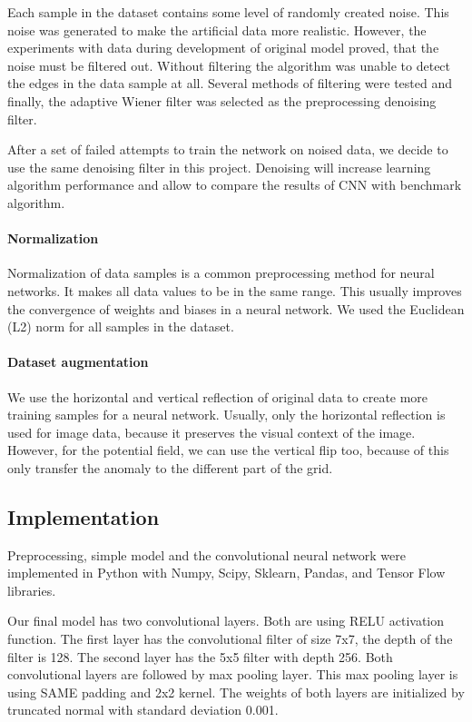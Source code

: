 \documentclass{article}
\begin{document}
Each sample in the dataset contains some level of randomly created
noise. This noise was generated to make the artificial data more
realistic. However, the experiments with data during development of
original model \cite{lenka}
proved, that the noise must be filtered out. Without filtering the
algorithm was unable to detect the edges in the data sample at all.
Several methods of filtering were tested and finally, the adaptive
Wiener filter was selected as the preprocessing denoising filter.

After a set of failed attempts to train the network on noised data, we
decide to use the same denoising filter in this project. Denoising will
increase learning algorithm performance and allow to compare the results
of CNN with benchmark algorithm.

\paragraph{Normalization}\label{normalization}

Normalization of data samples is a common preprocessing method for
neural networks. It makes all data values to be in the same range. This
usually improves the convergence of weights and biases in a neural
network. We used the Euclidean (L2) norm for all samples in the dataset.

\paragraph{Dataset augmentation}\label{dataset-augmentation}

We use the horizontal and vertical reflection of original data to create
more training samples for a neural network. Usually, only the horizontal
reflection is used for image data, because it preserves the visual
context of the image. However, for the potential field, we can use the
vertical flip too, because of this only transfer the anomaly to the
different part of the grid.

\subsection{Implementation}\label{implementation}

Preprocessing, simple model and the convolutional neural network were
implemented in Python with Numpy, Scipy, Sklearn, Pandas, and Tensor
Flow libraries.

Our final model has two convolutional layers. Both are using RELU
activation function. The first layer has the convolutional filter of
size 7x7, the depth of the filter is 128. The second layer has the 5x5
filter with depth 256. Both convolutional layers are followed by max
pooling layer. This max pooling layer is using SAME padding and 2x2
kernel. The weights of both layers are initialized by truncated normal
with standard deviation 0.001.
\end{document}
